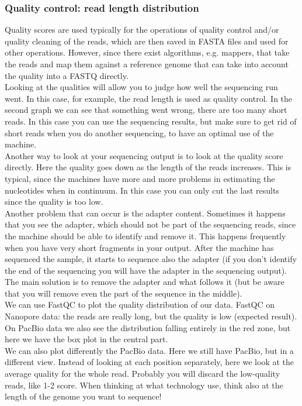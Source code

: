 \begin{description}
\subsubsection{Quality control: read length distribution}
Quality scores are used typically for the operations of quality control and/or quality cleaning of the reads, which are then saved in FASTA files and used for other operations. However, since there exist algorithms, e.g. mappers, that take the reads and map them against a reference genome that can take into account the quality into a FASTQ directly. 
\\
Looking at the qualities will allow you to judge how well the sequencing run went. 
In this case, for example, the read length is used as quality control. In the second graph we can see that something went wrong, there are too many short reads. In this case you can use the sequencing results, but make sure to get rid of short reads when you do another sequencing, to have an optimal use of the machine. 
\\
Another way to look at your sequencing output is to look at the quality score directly. Here the quality goes down as the length of the reads increases. This is typical, since the machines have more and more problems in estimating the nucleotides when in continuum. In this case you can only cut the last results since the quality is too low. 
\\
Another problem that can occur is the adapter content. Sometimes it happens that you see the adapter, which should not be part of the sequencing reads, since the machine should be able to identify and remove it. This happens frequently when you have very short fragments in your output. After the machine has sequenced the sample, it starts to sequence also the adapter (if you don’t identify the end of the sequencing you will have the adapter in the sequencing output). The main solution is to remove the adapter and what follows it (but be aware that you will remove even the part of the sequence in the middle). 
\\
We can use FastQC to plot the quality distribution of our data. FastQC on 
Nanopore data: the reads are really long, but the quality is low (expected result). On PacBio data we also see the distribution falling entirely in the red zone, but here we have the box plot in the central part. 
\\
We can also plot differently the PacBio data. Here we still have PacBio, but in a different view. Instead of looking at each position separately, here we look at the average quality for the whole read. Probably you will discard the low-quality reads, like 1-2 score. When thinking at what technology use, think also at the length of the genome you want to sequence!


\end{description}
